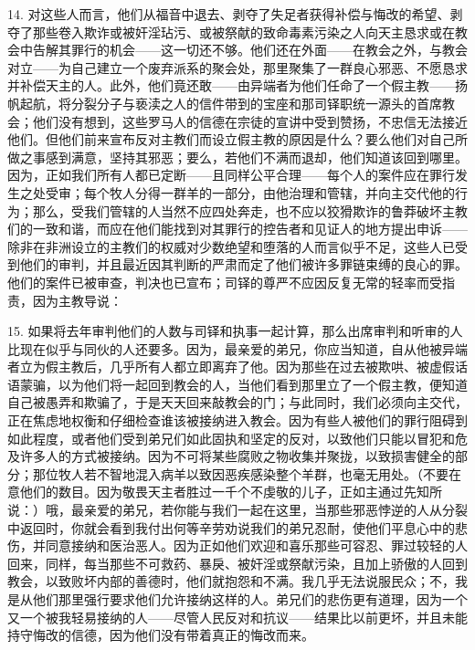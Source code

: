 14. 对这些人而言，他们从福音中退去、剥夺了失足者获得补偿与悔改的希望、剥夺了那些卷入欺诈或被奸淫玷污、或被祭献的致命毒素污染之人向天主恳求或在教会中告解其罪行的机会——这一切还不够。他们还在外面——在教会之外，与教会对立——为自己建立一个废弃派系的聚会处，那里聚集了一群良心邪恶、不愿恳求并补偿天主的人。此外，他们竟还敢——由异端者为他们任命了一个假主教——扬帆起航，将分裂分子与亵渎之人的信件带到的宝座和那司铎职统一源头的首席教会；他们没有想到，这些罗马人的信德在宗徒的宣讲中受到赞扬，不忠信无法接近他们。但他们前来宣布反对主教们而设立假主教的原因是什么？要么他们对自己所做之事感到满意，坚持其邪恶；要么，若他们不满而退却，他们知道该回到哪里。因为，正如我们所有人都已定断——且同样公平合理——每个人的案件应在罪行发生之处受审；每个牧人分得一群羊的一部分，由他治理和管辖，并向主交代他的行为；那么，受我们管辖的人当然不应四处奔走，也不应以狡猾欺诈的鲁莽破坏主教们的一致和谐，而应在他们能找到对其罪行的控告者和见证人的地方提出申诉——除非在非洲设立的主教们的权威对少数绝望和堕落的人而言似乎不足，这些人已受到他们的审判，并且最近因其判断的严肃而定了他们被许多罪链束缚的良心的罪。他们的案件已被审查，判决也已宣布；司铎的尊严不应因反复无常的轻率而受指责，因为主教导说：\par

15. 如果将去年审判他们的人数与司铎和执事一起计算，那么出席审判和听审的人比现在似乎与同伙的人还要多。因为，最亲爱的弟兄，你应当知道，自从他被异端者立为假主教后，几乎所有人都立即离弃了他。因为那些在过去被欺哄、被虚假话语蒙骗，以为他们将一起回到教会的人，当他们看到那里立了一个假主教，便知道自己被愚弄和欺骗了，于是天天回来敲教会的门；与此同时，我们必须向主交代，正在焦虑地权衡和仔细检查谁该被接纳进入教会。因为有些人被他们的罪行阻碍到如此程度，或者他们受到弟兄们如此固执和坚定的反对，以致他们只能以冒犯和危及许多人的方式被接纳。因为不可将某些腐败之物收集并聚拢，以致损害健全的部分；那位牧人若不智地混入病羊以致因恶疾感染整个羊群，也毫无用处。（不要在意他们的数目。因为敬畏天主者胜过一千个不虔敬的儿子，正如主通过先知所说：）哦，最亲爱的弟兄，若你能与我们一起在这里，当那些邪恶悖逆的人从分裂中返回时，你就会看到我付出何等辛劳劝说我们的弟兄忍耐，使他们平息心中的悲伤，并同意接纳和医治恶人。因为正如他们欢迎和喜乐那些可容忍、罪过较轻的人回来，同样，每当那些不可救药、暴戾、被奸淫或祭献污染，且加上骄傲的人回到教会，以致败坏内部的善德时，他们就抱怨和不满。我几乎无法说服民众；不，我是从他们那里强行要求他们允许接纳这样的人。弟兄们的悲伤更有道理，因为一个又一个被我轻易接纳的人——尽管人民反对和抗议——结果比以前更坏，并且未能持守悔改的信德，因为他们没有带着真正的悔改而来。\par

